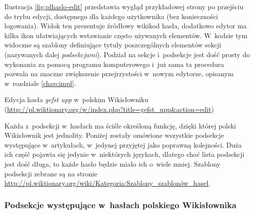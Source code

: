 \documentclass{pracamgr}
\begin{document}
Ilustracja \ref{fig:plhaslo-edit} przedstawia wygląd przykładowej strony po przejściu do trybu edycji, dostępnego dla każdego użytkownika (bez konieczności logowania). Widok ten prezentuje źródłowy wikikod hasła, dodatkowo edytor ma kilka ikon ułatwiających wstawianie często używanych elementów. W~kodzie tym widoczne są szablony definiujące tytuły poszczególnych elementów sekcji (nazywanych dalej \emph{podsekcjami}). Podział na sekcje i~podsekcje jest dość prosty do wykonania za pomocą programu komputerowego i~już sama ta procedura pozwala na znaczne zwiększenie przejrzystości w~nowym edytorze, opisanym w~rozdziale \ref{chap:impl}.

\begin{illustration}
	\caption{Edycja hasła \emph{gefst upp} w~polskim Wikisłowniku (\protect\url{http://pl.wiktionary.org/w/index.php?title=gefst_upp&action=edit})}
	\label{fig:plhaslo-edit}
\end{illustration}

Każda z~podsekcji w~hasłach ma ściśle określoną funkcję, dzięki której polski Wikisłownik jest jednolity. Poniżej zostały omówione wszystkie podsekcje występujące w~artykułach, w~jedynej przyjętej jako poprawną kolejności. Duża ich część pojawia się jedynie w~niektórych językach, dlatego choć lista podsekcji jest dość długa, to każde hasło będzie miało ich o~wiele mniej. Szablony podsekcji zebrane są na stronie \url{http://pl.wiktionary.org/wiki/Kategoria:Szablony_szablonów_haseł}.
\subsubsection{Podsekcje występujące w~hasłach polskiego Wikisłownika}
\end{document}
